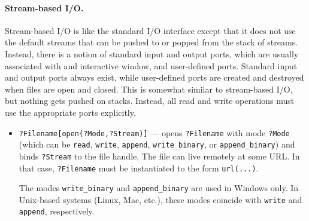 \documentclass[11pt]{article}
\begin{document}
\paragraph{Stream-based I/O.}
Stream-based I/O is like the standard I/O interface
except that it does not use the
default streams that can be pushed to or popped from the stack of streams.
Instead, there is a notion of standard input and output ports, which are
usually associated with and interactive window, and user-defined ports.
Standard input and output ports always exist, while user-defined ports
are created and destroyed when files are open and closed. This is somewhat 
similar to stream-based I/O, but nothing gets pushed on stacks. Instead,
all read and write operations must use the appropriate ports explicitly.
\begin{itemize}
\item  {\tt ?Filename[open(?Mode,?Stream)]} --- opens {\tt ?Filename} with mode
  {\tt ?Mode} (which can be {\tt read}, {\tt write}, {\tt append},
  \texttt{write\_binary}, or \texttt{append\_binary}) and
  binds {\tt ?Stream} to the file handle.
  The file can live remotely at some URL. In that case, {\tt ?Filename}
  must be instantiated to the form {\tt url(...)}.  

  The modes \texttt{write\_binary} and \texttt{append\_binary} are used in
  Windows only. In Unix-based systems (Linux, Mac, etc.), these modes
  coincide with {\tt write} and {\tt append}, respectively.


\end{itemize}
\end{document}
